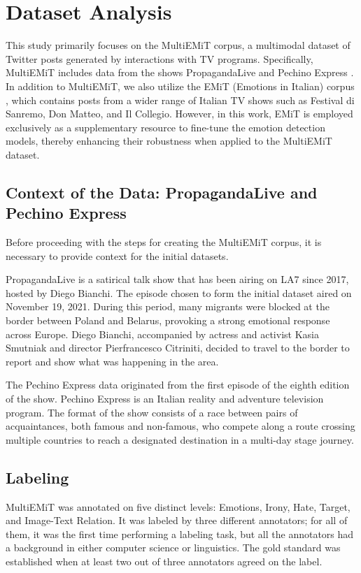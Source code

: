 \documentclass[letterpaper,journal]{IEEEtran}
\begin{document}
\section{Dataset Analysis}
This study primarily focuses on the MultiEMiT corpus, a multimodal dataset of Twitter posts generated by interactions with TV programs. Specifically, MultiEMiT includes data from the shows PropagandaLive and Pechino Express \cite{propagandalive,pechinoexpress}. In addition to MultiEMiT, we also utilize the EMiT (Emotions in Italian) corpus \cite{emit}, which contains posts from a wider range of Italian TV shows such as Festival di Sanremo, Don Matteo, and Il Collegio. However, in this work, EMiT is employed exclusively as a supplementary resource to fine-tune the emotion detection models, thereby enhancing their robustness when applied to the MultiEMiT dataset.

\subsection{Context of the Data: PropagandaLive and Pechino Express}

Before proceeding with the steps for creating the MultiEMiT corpus, it is necessary to provide context for the initial datasets.

PropagandaLive is a satirical talk show that has been airing on LA7 since 2017, hosted by Diego Bianchi. The episode chosen to form the initial dataset aired on November 19, 2021. During this period, many migrants were blocked at the border between Poland and Belarus, provoking a strong emotional response across Europe. Diego Bianchi, accompanied by actress and activist Kasia Smutniak and director Pierfrancesco Citriniti, decided to travel to the border to report and show what was happening in the area.

The Pechino Express data originated from the first episode of the eighth edition of the show. Pechino Express is an Italian reality and adventure television program. The format of the show consists of a race between pairs of acquaintances, both famous and non-famous, who compete along a route crossing multiple countries to reach a designated destination in a multi-day stage journey.

\subsection{Labeling}
MultiEMiT was annotated on five distinct levels: Emotions, Irony, Hate, Target, and Image-Text Relation.
It was labeled by three different annotators; for all of them, it was the first time performing a labeling task, but all the annotators had a background in either computer science or linguistics. The gold standard was established when at least two out of three annotators agreed on the label.
\end{document}
